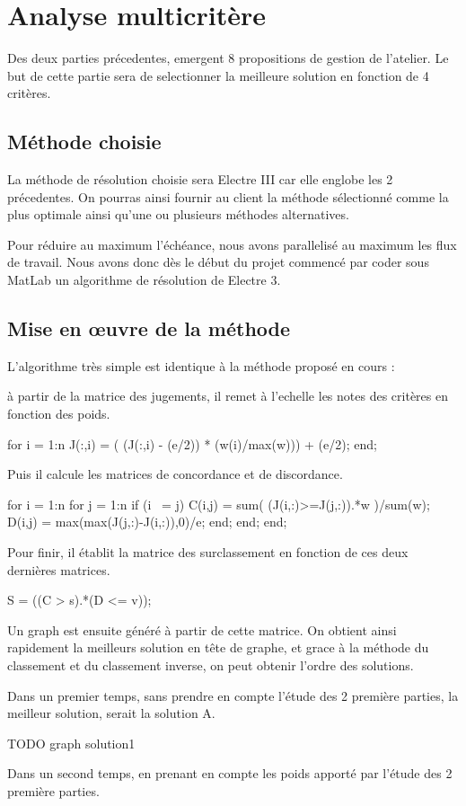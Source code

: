 \section{Analyse multicritère}

Des deux parties précedentes, emergent 8 propositions de gestion de l'atelier.
Le but de cette partie sera de selectionner la meilleure solution en fonction de 4 critères.

\subsection{Méthode choisie}

La méthode de résolution choisie sera Electre III car elle englobe les 2 précedentes.
On pourras ainsi fournir au client la méthode sélectionné comme la plus optimale ainsi qu'une ou plusieurs méthodes alternatives.

Pour réduire au maximum l'échéance, nous avons parallelisé au maximum les flux de travail.
Nous avons donc dès le début du projet commencé par coder sous MatLab un algorithme de résolution de Electre 3.

\subsection{Mise en œuvre de la méthode}

L'algorithme très simple est identique à la méthode proposé en cours :

à partir de la matrice des jugements, il remet à l'echelle les notes des critères en fonction des poids.

for i = 1:n
	J(:,i) = ( (J(:,i) - (e/2)) * (w(i)/max(w))) + (e/2);
end;

Puis il calcule les matrices de concordance et de discordance.

for i = 1:n
    for j = 1:n
        if (i ~= j)
            C(i,j) = sum( (J(i,:)>=J(j,:)).*w )/sum(w);
            D(i,j) = max(max(J(j,:)-J(i,:)),0)/e;
        end;
    end;
end;

Pour finir, il établit la matrice des surclassement en fonction de ces deux dernières matrices.

S = ((C > s).*(D <= v));

Un graph est ensuite généré à partir de cette matrice.
On obtient ainsi rapidement la meilleurs solution en tête de graphe, et grace à la méthode du classement et du classement inverse, on peut obtenir l'ordre des solutions.


Dans un premier temps, sans prendre en compte l'étude des 2 première parties, la meilleur solution, serait la solution A.

TODO graph solution1

Dans un second temps, en prenant en compte les poids apporté par l'étude des 2 première parties.